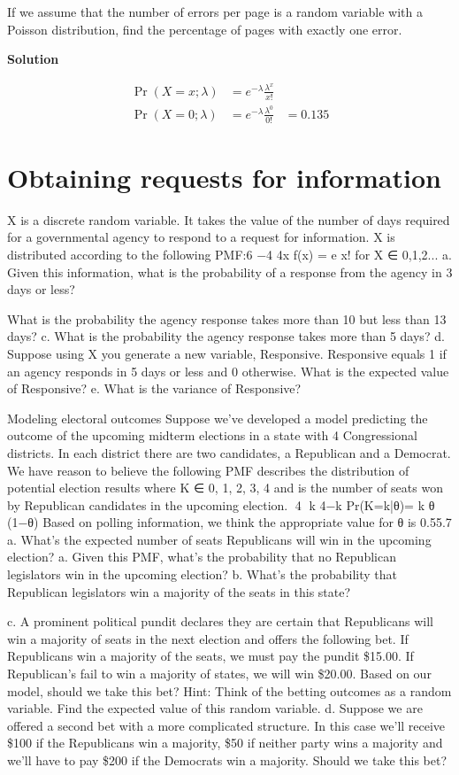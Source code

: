 \documentclass[12pt]{article}
\begin{document}
If we assume that the number of errors per page is a random variable with a Poisson distribution, find the
percentage of pages with exactly one error.

\textbf{Solution}

\begin{align*}
    \Pr(X=x; \lambda) &= e^{-\lambda}\frac{\lambda^x}{x!}
    \\ \Pr(X=0;\lambda) &= e^{-\lambda}\frac{\lambda^0}{0!} &= 0.135
\end{align*}

\section{Obtaining requests for information}
X is a discrete random variable. It takes the value of the number of days required for a governmental agency to respond to a request for information. X is distributed according to the following PMF:6
−4 4x
f(x) = e x! for X ∈ {0,1,2...}
a. Given this information, what is the probability of a response from the agency in 3 days or less?



What is the probability the agency response takes more than 10 but less than 13 days?
c. What is the probability the agency response takes more than 5 days?
d. Suppose using X you generate a new variable, Responsive. Responsive equals 1 if an agency responds in 5 days or less and 0 otherwise. What is the expected value of Responsive?
e. What is the variance of Responsive?

Modeling electoral outcomes
Suppose we’ve developed a model predicting the outcome of the upcoming midterm elections in a state with 4 Congressional districts. In each district there are two candidates, a Republican and a Democrat. We have reason to believe the following PMF describes the distribution of potential election results where K ∈ {0, 1, 2, 3, 4} and is the number of seats won by Republican candidates in the upcoming election.
4 k 4−k Pr(K=k|θ)= k θ (1−θ)
Based on polling information, we think the appropriate value for θ is 0.55.7
a. What’s the expected number of seats Republicans will win in the upcoming election?
a. Given this PMF, what’s the probability that no Republican legislators win in the upcoming election?
b. What’s the probability that Republican legislators win a majority of the seats in this state?

c. A prominent political pundit declares they are certain that Republicans will win a majority of seats in the next election and offers the following bet. If Republicans win a majority of the seats, we must pay the pundit \$15.00. If Republican’s fail to win a majority of states, we will win \$20.00. Based on our model, should we take this bet? Hint: Think of the betting outcomes as a random variable. Find the expected value of this random variable.
d. Suppose we are offered a second bet with a more complicated structure. In this case we’ll receive \$100 if the Republicans win a majority, \$50 if neither party wins a majority and we’ll have to pay \$200 if the Democrats win a majority. Should we take this bet?
\end{document}
